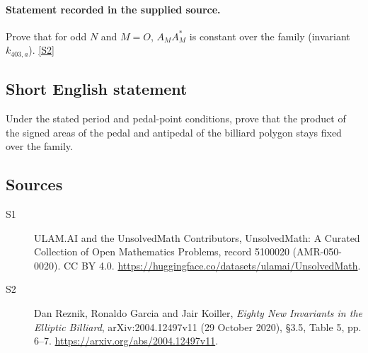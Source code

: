 \documentclass[11pt]{article}
\newcommand{\sref}[2]{\hyperlink{source:#1:#2}{[S#2]}}
\begin{document}
\paragraph{Statement recorded in the supplied source.}
Prove that for odd $N$ and $M=O$, $A_MA_M^*$ is constant over the family (invariant $k_{403,a}$). \sref{5100020}{2}
\subsection{Short English statement}
Under the stated period and pedal-point conditions, prove that the product of the signed areas of the pedal and antipedal of the billiard polygon stays fixed over the family.
\subsection{Sources}
\begin{description}
\item[\hypertarget{source:5100020:1}{S1}] ULAM.AI and the UnsolvedMath Contributors, UnsolvedMath: A Curated Collection of Open Mathematics Problems, record 5100020 (AMR-050-0020). CC BY 4.0. \url{https://huggingface.co/datasets/ulamai/UnsolvedMath}.
\item[\hypertarget{source:5100020:2}{S2}] Dan Reznik, Ronaldo Garcia and Jair Koiller, \emph{Eighty New Invariants in the Elliptic Billiard}, arXiv:2004.12497v11 (29 October 2020), \S3.5, Table 5, pp. 6--7. \url{https://arxiv.org/abs/2004.12497v11}.
\end{description}
\label{end:5100020}
\end{document}
